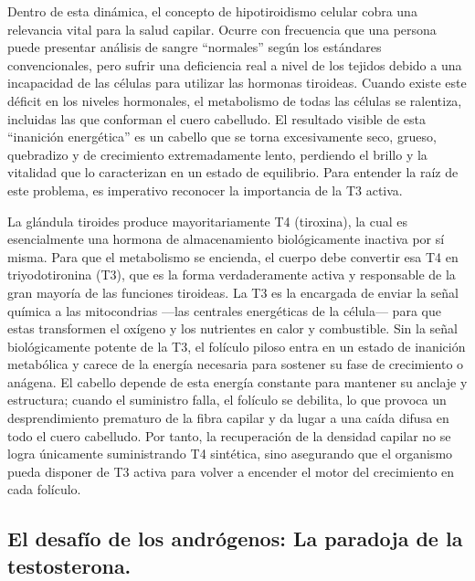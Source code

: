 \documentclass[
  spanish,
]{article}
\begin{document}
Dentro de esta dinámica, el concepto de hipotiroidismo celular cobra una relevancia vital para la salud capilar. Ocurre con frecuencia que una persona puede presentar análisis de sangre ``normales'' según los estándares convencionales, pero sufrir una deficiencia real a nivel de los tejidos debido a una incapacidad de las células para utilizar las hormonas tiroideas. Cuando existe este déficit en los niveles hormonales, el metabolismo de todas las células se ralentiza, incluidas las que conforman el cuero cabelludo. El resultado visible de esta ``inanición energética'' es un cabello que se torna excesivamente seco, grueso, quebradizo y de crecimiento extremadamente lento, perdiendo el brillo y la vitalidad que lo caracterizan en un estado de equilibrio.
Para entender la raíz de este problema, es imperativo reconocer la importancia de la T3 activa.

La glándula tiroides produce mayoritariamente T4 (tiroxina), la cual es esencialmente una hormona de almacenamiento biológicamente inactiva por sí misma. Para que el metabolismo se encienda, el cuerpo debe convertir esa T4 en triyodotironina (T3), que es la forma verdaderamente activa y responsable de la gran mayoría de las funciones tiroideas. La T3 es la encargada de enviar la señal química a las mitocondrias ---las centrales energéticas de la célula--- para que estas transformen el oxígeno y los nutrientes en calor y combustible.
Sin la señal biológicamente potente de la T3, el folículo piloso entra en un estado de inanición metabólica y carece de la energía necesaria para sostener su fase de crecimiento o anágena. El cabello depende de esta energía constante para mantener su anclaje y estructura; cuando el suministro falla, el folículo se debilita, lo que provoca un desprendimiento prematuro de la fibra capilar y da lugar a una caída difusa en todo el cuero cabelludo. Por tanto, la recuperación de la densidad capilar no se logra únicamente suministrando T4 sintética, sino asegurando que el organismo pueda disponer de T3 activa para volver a encender el motor del crecimiento en cada folículo.

\subsection{El desafío de los andrógenos: La paradoja de la testosterona.}\label{el-desafuxedo-de-los-andruxf3genos-la-paradoja-de-la-testosterona.}
\end{document}
